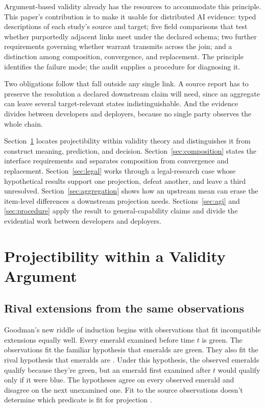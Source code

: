 \documentclass[12pt]{article}
\begin{document}
Argument-based validity already has the resources to accommodate this principle. This paper's contribution is to make it usable for distributed AI evidence: typed descriptions of each study's source and target; five field comparisons that test whether purportedly adjacent links meet under the declared schema; two further requirements governing whether warrant transmits across the join; and a distinction among composition, convergence, and replacement. The principle identifies the failure mode; the audit supplies a procedure for diagnosing it.

Two obligations follow that fall outside any single link. A source report has to preserve the resolution a declared downstream claim will need, since an aggregate can leave several target-relevant states indistinguishable. And the evidence divides between developers and deployers, because no single party observes the whole chain.

Section~\ref{sec:projectibility} locates projectibility within validity theory and distinguishes it from construct meaning, prediction, and decision. Section~\ref{sec:composition} states the interface requirements and separates composition from convergence and replacement. Section~\ref{sec:legal} works through a legal-research case whose hypothetical results support one projection, defeat another, and leave a third unresolved. Section~\ref{sec:aggregation} shows how an upstream mean can erase the item-level differences a downstream projection needs. Sections~\ref{sec:agi} and \ref{sec:procedure} apply the result to general-capability claims and divide the evidential work between developers and deployers.

\section{Projectibility within a Validity Argument}\label{sec:projectibility}

\subsection{Rival extensions from the same observations}\label{ssec:goodman}

Goodman's new riddle of induction begins with observations that fit incompatible extensions equally well. Every emerald examined before time \(t\) is green. The observations fit the familiar hypothesis that emeralds are green. They also fit the rival hypothesis that emeralds are . Under this hypothesis, the observed emeralds qualify because they're green, but an emerald first examined after \(t\) would qualify only if it were blue. The hypotheses agree on every observed emerald and disagree on the next unexamined one. Fit to the source observations doesn't determine which predicate is fit for projection \citep[74--80]{goodman1983}.
\end{document}
